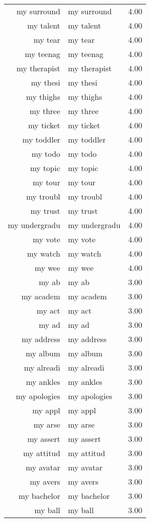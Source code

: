 \begin{table}[ht]
\begin{tabular}{rlr}
  my surround & my surround & 4.00 \\ 
  my talent & my talent & 4.00 \\ 
  my tear & my tear & 4.00 \\ 
  my teenag & my teenag & 4.00 \\ 
  my therapist & my therapist & 4.00 \\ 
  my thesi & my thesi & 4.00 \\ 
  my thighs & my thighs & 4.00 \\ 
  my three & my three & 4.00 \\ 
  my ticket & my ticket & 4.00 \\ 
  my toddler & my toddler & 4.00 \\ 
  my todo & my todo & 4.00 \\ 
  my topic & my topic & 4.00 \\ 
  my tour & my tour & 4.00 \\ 
  my troubl & my troubl & 4.00 \\ 
  my trust & my trust & 4.00 \\ 
  my undergradu & my undergradu & 4.00 \\ 
  my vote & my vote & 4.00 \\ 
  my watch & my watch & 4.00 \\ 
  my wee & my wee & 4.00 \\ 
  my ab & my ab & 3.00 \\ 
  my academ & my academ & 3.00 \\ 
  my act & my act & 3.00 \\ 
  my ad & my ad & 3.00 \\ 
  my address & my address & 3.00 \\ 
  my album & my album & 3.00 \\ 
  my alreadi & my alreadi & 3.00 \\ 
  my ankles & my ankles & 3.00 \\ 
  my apologies & my apologies & 3.00 \\ 
  my appl & my appl & 3.00 \\ 
  my arse & my arse & 3.00 \\ 
  my assert & my assert & 3.00 \\ 
  my attitud & my attitud & 3.00 \\ 
  my avatar & my avatar & 3.00 \\ 
  my avers & my avers & 3.00 \\ 
  my bachelor & my bachelor & 3.00 \\ 
  my ball & my ball & 3.00 \\ 

\end{tabular}
\end{table}
